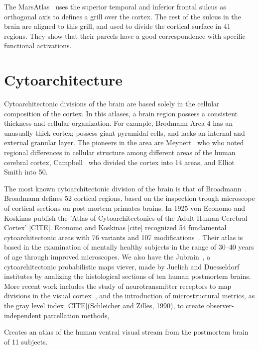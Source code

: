 The MarsAtlas~\cite{Auzias2016} uses the superior temporal and inferior frontal
sulcus as orthogonal axis to defines a grill over the cortex. The rest of the
sulcus in the brain are aligned to this grill, and used to divide the cortical
surface in 41 regions. They show that their parcels have a good correspondence
with specific functional activations.


\section{Cytoarchitecture}
\label{sec:cyto_maps}

Cytoarchitectonic divisions of the brain are based solely in the cellular
composition of the cortex. In this atlases, a brain region possess a consistent
thickness and cellular organization. For example, Brodmann Area 4 has an unusually
thick cortex; possess giant pyramidal cells, and lacks an internal and external
granular layer. The pioneers in the area are Meynert~\cite{Meynert1872} who
who noted regional differences in cellular structure among different areas of the human cerebral cortex,
Campbell~\cite{Campbell1905} who divided the cortex into 14 areas, and Elliot Smith\cite{Smith1907}
into 50.

The most known cytoarchitectonic division of the brain is that
of Broadmann~\cite{Brodmann1909}. Broadmann defines 52 cortical regions, based
on the inspection trough microscope of cortical sections on post-mortem
primates brains. In 1925 von Economo and Koskinas publish the 'Atlas of 
Cytoarchitectonics of the Adult Human Cerebral Cortex' [CITE]. Economo and
Koskinas [cite] recognized 54 fundamental cytoarchitectonic areas with 76
variants and 107 modifications~\cite{Triarhou2007}. Their atlas is based in the
examination of mentally healthy subjects in the range of 30–40 years of age
through improved microscopes. We also have the Jubrain~\cite{Mohlberg2012}, a
cytoarchitectonic probabilistic maps viever, made by Juelich and Duesseldorf
institutes by analizing the histological sections of ten human postmortem brains.
More recent work includes the study of
neurotransmitter receptors to map divisions in the visual cortex~\cite{Eickhoff2008}, 
and the introduction of microstructural metrics, as the gray level index
[CITE](Schleicher and Zilles, 1990), to create observer-independent parcellation
methods, 

Creates an atlas of the human ventral visual stream from the postmortem brain
of 11 subjects\cite{Rosenke2018}.
    


